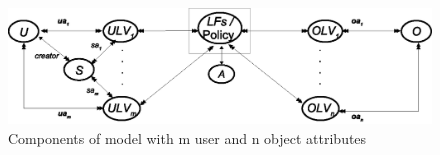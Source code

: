 
 	\begin{figure} 
 		\centering
 		\includegraphics[width=.9\textwidth]{DBSEC16/lpabac-mn}
 		\caption{Components of \LPModels{} model with m user and n object attributes}
 		\label{fig:lp-abacmn-diagram}
 	\end{figure}
